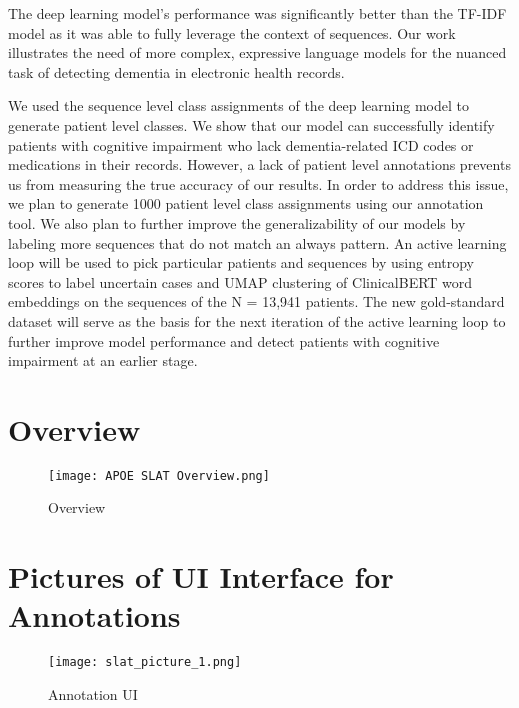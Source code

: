 \documentclass[pmlr,twocolumn,10pt]{jmlr} %
\begin{document}
The deep learning model's performance was significantly better than the TF-IDF model as it was able to fully leverage the context of sequences. Our work illustrates the need of more complex, expressive language models for the nuanced task of detecting dementia in electronic health records.

We used the sequence level class assignments of the deep learning model to generate patient level classes. We show that our model can successfully identify patients with cognitive impairment who lack dementia-related ICD codes or medications in their records. However, a lack of patient level annotations prevents us from measuring the true accuracy of our results. In order to address this issue, we plan to generate 1000 patient level class assignments using our annotation tool. We also plan to further improve the generalizability of our models by labeling more sequences that do not match an always pattern. An active learning loop will be used to pick particular patients and sequences by using entropy scores to label uncertain cases and UMAP clustering \citep{mcinnes2018umap} of ClinicalBERT word embeddings on the sequences of the N = 13,941 patients. The new gold-standard dataset will serve as the basis for the next iteration of the active learning loop to further improve model performance and detect patients with cognitive impairment at an earlier stage.

\clearpage



\nocite{*}

\clearpage

\appendix

\section{Overview}
\begin{figure}[h] \label{app:overview}
\centering 
\texttt{[image: APOE SLAT Overview.png]}
\caption{Overview}

\end{figure}

\clearpage

\section{Pictures of UI Interface for Annotations} 
\label{app:slat}
\begin{figure}[h]
\centering 
\texttt{[image: slat\_picture\_1.png]}
\caption{Annotation UI}
\end{figure}
\end{document}
